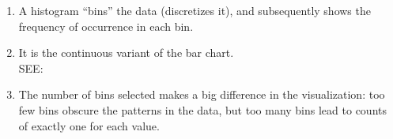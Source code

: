 \begin{table}[H]
\begin{minipage}[t]{0.57\linewidth}
\begin{enumerate}
    \item A histogram “bins” the data (discretizes it), and subsequently shows the frequency of occurrence in each bin. \hfill \cite{statistics/book/Statistics-for-Data-Scientists/Maurits-Kaptein}

    \item It is the continuous variant of the bar chart. \hfill \cite{statistics/book/Statistics-for-Data-Scientists/Maurits-Kaptein}\\
    SEE: 

    \item The number of bins selected makes a big difference in the visualization: too few bins obscure the patterns in the data, but too many bins lead to counts of exactly one for each value. \hfill \cite{statistics/book/Statistics-for-Data-Scientists/Maurits-Kaptein}
\end{enumerate}

\end{minipage}
\end{table}
